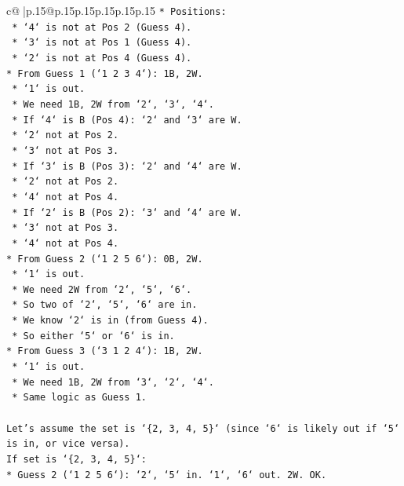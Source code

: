\documentclass{article}
\begin{document}
{\begin{supertabular}{c@{$\;$}|p{.15\linewidth}@{}p{.15\linewidth}p{.15\linewidth}p{.15\linewidth}p{.15\linewidth}p{.15\linewidth}}
{{{\texttt{*   Positions:} \\
\texttt{    *   `4` is not at Pos 2 (Guess 4).} \\
\texttt{    *   `3` is not at Pos 1 (Guess 4).} \\
\texttt{    *   `2` is not at Pos 4 (Guess 4).} \\
\texttt{*   From Guess 1 (`1 2 3 4`): 1B, 2W.} \\
\texttt{    *   `1` is out.} \\
\texttt{    *   We need 1B, 2W from `2`, `3`, `4`.} \\
\texttt{    *   If `4` is B (Pos 4): `2` and `3` are W.} \\
\texttt{        *   `2` not at Pos 2.} \\
\texttt{        *   `3` not at Pos 3.} \\
\texttt{    *   If `3` is B (Pos 3): `2` and `4` are W.} \\
\texttt{        *   `2` not at Pos 2.} \\
\texttt{        *   `4` not at Pos 4.} \\
\texttt{    *   If `2` is B (Pos 2): `3` and `4` are W.} \\
\texttt{        *   `3` not at Pos 3.} \\
\texttt{        *   `4` not at Pos 4.} \\
\texttt{*   From Guess 2 (`1 2 5 6`): 0B, 2W.} \\
\texttt{    *   `1` is out.} \\
\texttt{    *   We need 2W from `2`, `5`, `6`.} \\
\texttt{    *   So two of `2`, `5`, `6` are in.} \\
\texttt{    *   We know `2` is in (from Guess 4).} \\
\texttt{    *   So either `5` or `6` is in.} \\
\texttt{*   From Guess 3 (`3 1 2 4`): 1B, 2W.} \\
\texttt{    *   `1` is out.} \\
\texttt{    *   We need 1B, 2W from `3`, `2`, `4`.} \\
\texttt{    *   Same logic as Guess 1.} \\
\\ 
\texttt{Let's assume the set is `\{2, 3, 4, 5\}` (since `6` is likely out if `5` is in, or vice versa).} \\
\texttt{If set is `\{2, 3, 4, 5\}`:} \\
\texttt{*   Guess 2 (`1 2 5 6`): `2`, `5` in. `1`, `6` out. 2W. OK.} \\
}}}
\end{supertabular}}
\end{document}
